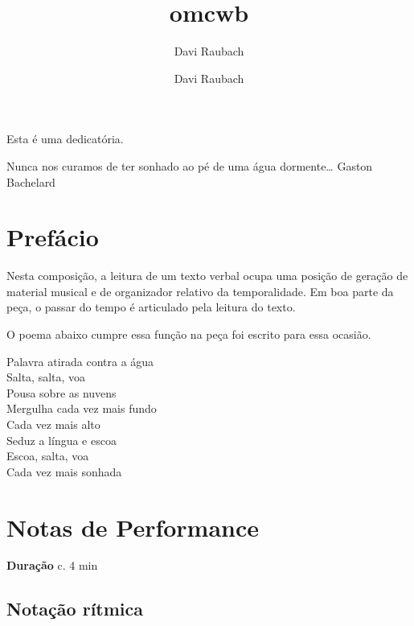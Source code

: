 \documentclass[article,12pt,openany,oneside,a4paper,chapter=TITLE,hyphen,english,brazil,chapter=TITLE,sumario=tradicional]{abntex2}
\author{Davi Raubach}
\author{Davi Raubach}
\date{}
\title{omcwb}
\begin{document}
\OnehalfSpacing

\pretextual

\imprimircapa
\newpage

\begin{dedicatoria}
\vspace*{\fill}
Esta é uma dedicatória.

\vspace*{\fill}
\end{dedicatoria}
\newpage

\begin{epigrafe}
\vspace*{\fill}
Nunca nos curamos de ter sonhado ao pé de uma água dormente\ldots{}
Gaston Bachelard
\vspace*{\fill}
\end{epigrafe}
\newpage



\textual


\section*{Prefácio}
\label{sec:org978633b}
Nesta composição, a leitura de um texto verbal ocupa uma posição de geração de material musical e de organizador relativo da temporalidade. Em boa parte da peça, o passar do tempo é articulado pela leitura do texto.

O poema abaixo cumpre essa função na peça foi escrito para essa ocasião.

\begin{center}


Palavra atirada contra a água\\
Salta, salta, voa\\
Pousa sobre as nuvens\\
Mergulha cada vez mais fundo\\
Cada vez mais alto\\
Seduz a língua e escoa\\
Escoa, salta, voa\\
Cada vez mais sonhada
\end{center}


\section*{Notas de Performance}
\label{sec:org38a70ba}

\textbf{Duração} c. 4 min

\subsection*{Notação rítmica}
\label{sec:org1083797}
\end{document}
